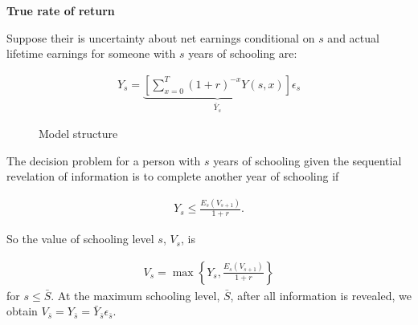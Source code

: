\begin{frame}\begin{center}
	\LARGE\textbf{True rate of return}
\end{center}\end{frame}
\begin{frame}
Suppose their is uncertainty about net earnings conditional on $s$ and actual lifetime earnings for someone with $s$ years of schooling are:

\begin{align*}
Y_s = \underbrace{\left[\sum^T_{x = 0}(1 + r)^{-x} Y(s, x)\right]}_{\bar{Y}_s}\epsilon_s
\end{align*}
\end{frame}
\begin{frame}
\begin{figure}[htp]\centering
\caption{Model structure}
\end{figure}
\end{frame}
\begin{frame}
The decision problem for a person with $s$ years of schooling given the sequential revelation of information is to complete another year of schooling if

\begin{align*}
Y_s \leq \frac{E_s(V_{s+1})}{1 + r}.
\end{align*}

\end{frame}
\begin{frame}
So the value of schooling level $s$, $V_s$, is

\begin{align*}
V_s = \max\left\{Y_s, \frac{E_s(V_{s+1})}{1 + r}\right\}
\end{align*}
for $s \leq \bar{S}$. At the maximum schooling level, $\bar{S}$, after all information is revealed, we obtain $V_{\bar{s}} = Y_{\bar{s}} = \bar{Y}_{\bar{s}}\epsilon_{\bar{s}}$.

\end{frame}
